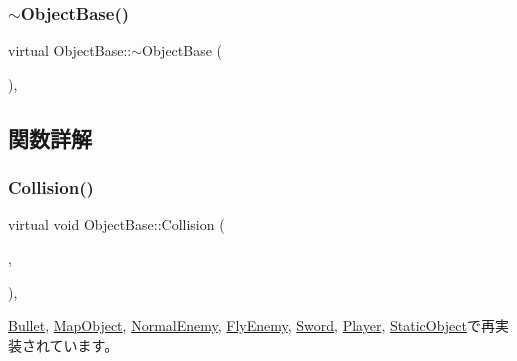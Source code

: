 \subsubsection{\texorpdfstring{$\sim$\+Object\+Base()}{~ObjectBase()}}
{\footnotesize\ttfamily virtual Object\+Base\+::$\sim$\+Object\+Base (\begin{DoxyParamCaption}{ }\end{DoxyParamCaption})\hspace{0.3cm}{\ttfamily [inline]}, {\ttfamily [virtual]}}



\subsection{関数詳解}
\mbox{\label{class_object_base_ad772d7a42f5e46c39481f5db22ee8193}} 
\subsubsection{\texorpdfstring{Collision()}{Collision()}}
{\footnotesize\ttfamily virtual void Object\+Base\+::\+Collision (\begin{DoxyParamCaption}\item[{\mbox{\hyperlink{class_object_base}{Object\+Base}} $\ast$}]{,  }\item[{\mbox{\hyperlink{common_8h_afb0c5e21d4133ff4f200992c0b534e1b}{V\+E\+C2}}}]{ }\end{DoxyParamCaption})\hspace{0.3cm}{\ttfamily [inline]}, {\ttfamily [virtual]}}



\mbox{\hyperlink{class_bullet_a945da4a16d11cfee31139d564bea61f0}{Bullet}}, \mbox{\hyperlink{class_map_object_a61c2b7e046b76d98adbf23c9e6302918}{Map\+Object}}, \mbox{\hyperlink{class_normal_enemy_ac27e00973d2430da57e044bfe04fe5b4}{Normal\+Enemy}}, \mbox{\hyperlink{class_fly_enemy_adaabf7ce270104e30df29bfa464d72ce}{Fly\+Enemy}}, \mbox{\hyperlink{class_sword_acb6e5846afb674bc1ec47dcfee0a6bd3}{Sword}}, \mbox{\hyperlink{class_player_a184fbb2c70e34fb6c6a0c2fc7e0f86c9}{Player}}, \mbox{\hyperlink{class_static_object_abe05f711f0d62319e1a11419813c5d50}{Static\+Object}}で再実装されています。

\mbox{\label{class_object_base_a7fa4c548153c3af20f89673ffea809af}} 
